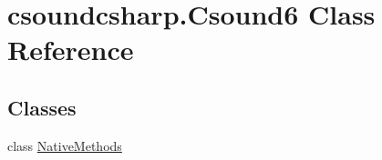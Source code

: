 \hypertarget{classcsoundcsharp_1_1_csound6}{}\section{csoundcsharp.\+Csound6 Class Reference}
\label{classcsoundcsharp_1_1_csound6}
\subsection*{Classes}
\begin{DoxyCompactItemize}
\item 
class \hyperlink{classcsoundcsharp_1_1_csound6_1_1_native_methods}{Native\+Methods}
\end{DoxyCompactItemize}
